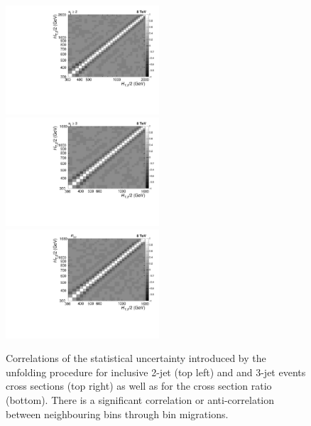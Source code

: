 \begin{figure}[!h]
 \begin{center}
 \hspace*{-3mm}\includegraphics[width=0.51\textwidth]{Plots_HT_2_150/Correlation_Matrix_NLO_2_ite4.pdf}%
 ~~\includegraphics[width=0.51\textwidth]{Plots_HT_2_150/Correlation_Matrix_NLO_3_ite4.pdf}\\
 \includegraphics[width=0.51\textwidth]{Plots_HT_2_150/Correlation_Matrix_NLO_Ratio_32_ite4.pdf}
 \caption{Correlations of the statistical uncertainty introduced by the unfolding procedure for inclusive 2-jet (top left) and and 3-jet events cross sections (top right) as well as for the cross section ratio \ratio (bottom). There is a significant correlation or anti-correlation between neighbouring bins through bin migrations.}
 \label{fig:corr}
 \end{center}
\end{figure}
